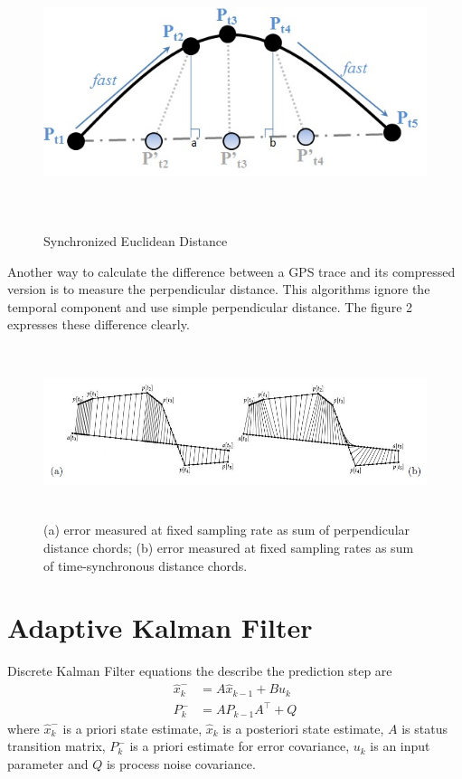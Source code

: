 \begin{figure}[h]
\centering
\includegraphics[width=16cm, height=8cm]{Chapters/06Spinoff/plot/sed.jpg}
\caption{Synchronized Euclidean Distance}
\end{figure}

Another way to calculate the difference between a GPS trace and its compressed version is to measure the perpendicular distance. This algorithms ignore the temporal component and use simple perpendicular distance. The figure 2 \cite{meratnia2004spatiotemporal} expresses these difference clearly. 

\begin{figure}[h]
\centering
\includegraphics[width=13cm, height=5cm]{Chapters/06Spinoff/plot/ab.JPG}
\caption{(a) error measured at fixed sampling rate as sum of perpendicular distance chords; (b) error measured at fixed sampling rates as sum of time-synchronous distance chords.}
\end{figure}

\clearpage 

\section{Adaptive Kalman Filter}
Discrete Kalman Filter equations the describe the prediction step are
\begin{align*}
\hat{x}_k^-&=A\hat{x}_{k-1}+Bu_k \\
P_k^-&=AP_{k-1}A^\top+Q
\end{align*}
where $\hat{x}_k^-$ is a priori state estimate, $\hat{x}_k$ is a posteriori state estimate, $A$ is status transition matrix, $P_k^-$ is a priori estimate for error covariance, $u_k$ is an input parameter and $Q$ is process noise covariance. 

